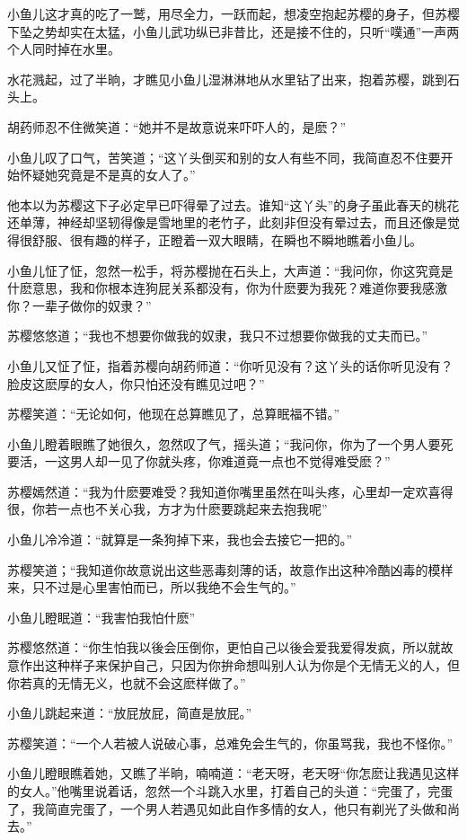 \documentclass[12pt,oneside]{book}
\begin{document}
小鱼儿这才真的吃了一鹫，用尽全力，一跃而起，想凌空抱起苏樱的身子，但苏樱下坠之势却实在太猛，小鱼儿武功纵已非昔比，还是接不住的，只听``噗通''一声两个人同时掉在水里。

水花溅起，过了半晌，才瞧见小鱼儿湿淋淋地从水里钻了出来，抱着苏樱，跳到石头上。

胡药师忍不住微笑道：``她并不是故意说来吓吓人的，是麽？''

小鱼儿叹了口气，苦笑道；``这丫头倒买和别的女人有些不同，我简直忍不住要开始怀疑她究竟是不是真的女人了。''

他本以为苏樱这下子必定早已吓得晕了过去。谁知``这丫头''的身子虽此春天的桃花还单薄，神经却坚轫得像是雪地里的老竹子，此刻非但没有晕过去，而且还像是觉得很舒服、很有趣的样子，正瞪着一双大眼睛，在瞬也不瞬地瞧着小鱼儿。

小鱼儿怔了怔，忽然一松手，将苏樱抛在石头上，大声道：``我问你，你这究竟是什麽意思，我和你根本连狗屁关系都没有，你为什麽要为我死？难道你要我感激你？一辈子做你的奴隶？''

苏樱悠悠道；``我也不想要你做我的奴隶，我只不过想要你做我的丈夫而已。''

小鱼儿又怔了怔，指着苏樱向胡药师道：``你听见没有？这丫头的话你听见没有？脸皮这麽厚的女人，你只怕还没有瞧见过吧？''

苏樱笑道：``无论如何，他现在总算瞧见了，总算眠福不错。''

小鱼儿瞪着眼瞧了她很久，忽然叹了气，摇头道；``我问你，你为了一个男人要死要活，一这男人却一见了你就头疼，你难道竟一点也不觉得难受麽？''

苏樱嫣然道：``我为什麽要难受？我知道你嘴里虽然在叫头疼，心里却一定欢喜得很，你若一点也不关心我，方才为什麽要跳起来去抱我呢''

小鱼儿冷冷道：``就算是一条狗掉下来，我也会去接它一把的。''

苏樱笑道；``我知道你故意说出这些恶毒刻薄的话，故意作出这种冷酷凶毒的模样来，只不过是心里害怕而已，所以我绝不会生气的。''

小鱼儿瞪眠道：``我害怕我怕什麽''

苏樱悠然道：``你生怕我以後会压倒你，更怕自己以後会爱我爱得发疯，所以就故意作出这种样子来保护自己，只因为你拚命想叫别人认为你是个无情无义的人，但你若真的无情无义，也就不会这麽样做了。''

小鱼儿跳起来道：``放屁放屁，简直是放屁。''

苏樱笑道：``一个人若被人说破心事，总难免会生气的，你虽骂我，我也不怪你。''

小鱼儿瞪眼瞧着她，又瞧了半晌，喃喃道：``老天呀，老天呀``你怎麽让我遇见这样的女人。''他嘴里说着话，忽然一个斗跳入水里，打着自己的头道：``完蛋了，完蛋了，我简直完蛋了，一个男人若遇见如此自作多情的女人，他只有剃光了头做和尚去。''
\end{document}
